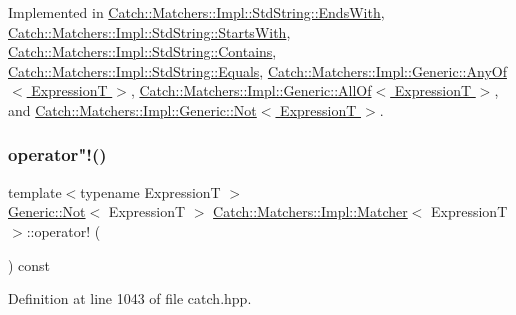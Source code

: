 Implemented in \hyperlink{struct_catch_1_1_matchers_1_1_impl_1_1_std_string_1_1_ends_with_aff66fb5af2d4f6161627cb20899b2c1b}{Catch\+::\+Matchers\+::\+Impl\+::\+Std\+String\+::\+Ends\+With}, \hyperlink{struct_catch_1_1_matchers_1_1_impl_1_1_std_string_1_1_starts_with_ab8f8d15e06d7ec13fee7d9ec4075dafa}{Catch\+::\+Matchers\+::\+Impl\+::\+Std\+String\+::\+Starts\+With}, \hyperlink{struct_catch_1_1_matchers_1_1_impl_1_1_std_string_1_1_contains_a2248f3d0d1eb5cf5a1059c183b811a7c}{Catch\+::\+Matchers\+::\+Impl\+::\+Std\+String\+::\+Contains}, \hyperlink{struct_catch_1_1_matchers_1_1_impl_1_1_std_string_1_1_equals_abf0a94b4e66dbd586268d9983f867e68}{Catch\+::\+Matchers\+::\+Impl\+::\+Std\+String\+::\+Equals}, \hyperlink{class_catch_1_1_matchers_1_1_impl_1_1_generic_1_1_any_of_adebd5437cdb8e0d54e16e97fe26e7e85}{Catch\+::\+Matchers\+::\+Impl\+::\+Generic\+::\+Any\+Of$<$ Expression\+T $>$}, \hyperlink{class_catch_1_1_matchers_1_1_impl_1_1_generic_1_1_all_of_a95231b6a455e1a646d0b54bce55138be}{Catch\+::\+Matchers\+::\+Impl\+::\+Generic\+::\+All\+Of$<$ Expression\+T $>$}, and \hyperlink{class_catch_1_1_matchers_1_1_impl_1_1_generic_1_1_not_a18c49fc6fb73a42d54650dafc18c7db1}{Catch\+::\+Matchers\+::\+Impl\+::\+Generic\+::\+Not$<$ Expression\+T $>$}.

\hypertarget{struct_catch_1_1_matchers_1_1_impl_1_1_matcher_a7ecd56842090611c9dbfc325b42fa942}{}\label{struct_catch_1_1_matchers_1_1_impl_1_1_matcher_a7ecd56842090611c9dbfc325b42fa942} 
\subsubsection{\texorpdfstring{operator"!()}{operator!()}}
{\footnotesize\ttfamily template$<$typename ExpressionT $>$ \\
\hyperlink{class_catch_1_1_matchers_1_1_impl_1_1_generic_1_1_not}{Generic\+::\+Not}$<$ ExpressionT $>$ \hyperlink{struct_catch_1_1_matchers_1_1_impl_1_1_matcher}{Catch\+::\+Matchers\+::\+Impl\+::\+Matcher}$<$ ExpressionT $>$\+::operator! (\begin{DoxyParamCaption}{ }\end{DoxyParamCaption}) const}



Definition at line 1043 of file catch.\+hpp.

\hypertarget{struct_catch_1_1_matchers_1_1_impl_1_1_matcher_adb060f348e3ed404b80209fbc62174e1}{}\label{struct_catch_1_1_matchers_1_1_impl_1_1_matcher_adb060f348e3ed404b80209fbc62174e1} 
